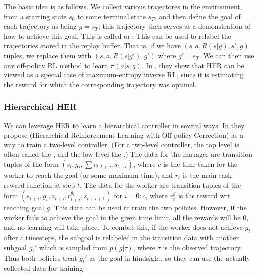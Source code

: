The basic idea is as follows.
We collect various trajectores  in the environment,
from a starting state $s_0$ to some terminal state $s_T$,
and then define the goal of each trajectory as being $g=s_T$;
this trajectory then serves as a demonstration
of how to achieve this goal.
This is called 
or  \citep{HER}.
This can be used to relabel the trajectories stored in the replay buffer.
That is, if we have $(s,a,R(s|g),s',g)$ tuples, we replace them with
$(s,a,R(s|g'),g')$ where $g'=s_T$.
We can then use any off-policy RL method to learn $\pi(a|s,g)$.
In \citep{Eysenbach2020}, they show that HER can be viewed as a special
case of maximum-entropy inverse RL,
since it is estimating the reward for which the corresponding
trajectory was optimal.

\subsubsection{Hierarchical HER}
\label{sec:HAC}
\label{sec:HIRO}

We can leverage HER to learn a hierarchical controller
in several ways. In \citep{Nachum2018}
they propose 
(Hierarchical Reinforcement Learning with Off-policy Correction)
as a way to train a two-level controller.
(For a two-level controller, the top level is often
called the , and the low level the .)
The data for the manager are transition tuples
of the form $(s_t, g_t, \sum r_{t:t+c}, s_{t+c})$,
where $c$ is the time taken for the worker to
reach the goal (or some maximum time),
and $r_t$ is the main task reward function at step $t$.
The data for the worker are transition tuples of the form
$(s_{t+i}, g_t, a_{t+i}, r_{t+i}^{g_t}, s_{t+i+1})$
for $i=0:c$, where $r_t^{g}$ is the reward
wrt reaching goal $g$.
This data can be used to train the two policies.
However, if the worker fails to achieve the goal
in the given time limit,
all the rewards will be 0, and no learning will take place.
To combat this,
if the worker does not achieve $g_t$
after $c$ timesteps, the subgoal is relabeled
in the transition data with another subgoal $g_t'$
which is sampled from $p(g|\tau)$,
where $\tau$ is the observed trajectory.
Thus both policies treat $g_t'$ as the goal in hindsight,
so they can use the actually collected data for training


